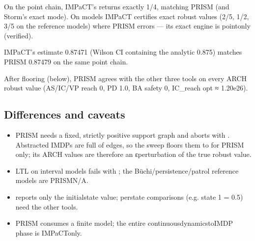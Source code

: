 \documentclass[a4paper,10pt,english]{sphinxmanual}
\begin{document}
\sphinxAtStartPar
{} On the point chain, IMPaCT’s 
returns exactly 1/4, matching PRISM  (and Storm’s exact mode). On 
models IMPaCT certifies exact robust values (2/5, 1/2, 3/5 on the reference models)
where PRISM errors — its exact engine is point\sphinxhyphen{}only (verified).

\sphinxAtStartPar
{} IMPaCT’s  estimate 0.87471 (Wilson CI
containing the analytic 0.875) matches PRISM  0.87479 on the same point chain.

\sphinxAtStartPar
{} After flooring (below), PRISM agrees with the other three
tools on every ARCH robust value (AS/IC/VP reach 0, PD 1.0, BA safety 0, IC\_reach opt
≈ 1.20e\sphinxhyphen{}26).


\subsection{Differences and caveats}
\label{\detokenize{comparison/impact-vs-prism:differences-and-caveats}}\begin{itemize}
\item {} 
\sphinxAtStartPar
{} PRISM needs a fixed, strictly positive support
graph and aborts with . Abstracted
IMDPs are full of \sphinxcode{\sphinxupquote{{[}0,hi{]}}} edges, so the sweep floors them to \sphinxcode{\sphinxupquote{{[}1e\sphinxhyphen{}9,hi{]}}} for PRISM
only; its ARCH values are therefore an ε\sphinxhyphen{}perturbation of the true robust value.

\item {} 
\sphinxAtStartPar
{} LTL on interval models fails with ; the Büchi/persistence/patrol reference models are PRISM\sphinxhyphen{}N/A.

\item {} 
\sphinxAtStartPar
{}  reports only the initial\sphinxhyphen{}state value; per\sphinxhyphen{}state
comparisons (e.g.  state 1 = 0.5) need the other tools.

\item {} 
\sphinxAtStartPar
{} PRISM consumes a finite model; the entire
continuous\sphinxhyphen{}dynamics\sphinxhyphen{}to\sphinxhyphen{}IMDP phase is IMPaCT\sphinxhyphen{}only.

\end{itemize}
\end{document}
